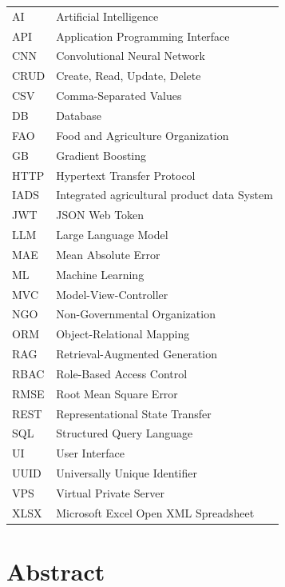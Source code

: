 \documentclass[12pt,a4paper,oneside]{report}
\begin{document}
\begin{tabular}{ll}
AI     & Artificial Intelligence \\
API    & Application Programming Interface \\
CNN    & Convolutional Neural Network \\
CRUD   & Create, Read, Update, Delete \\
CSV    & Comma-Separated Values \\
DB     & Database \\
FAO    & Food and Agriculture Organization \\
GB     & Gradient Boosting \\
HTTP   & Hypertext Transfer Protocol \\
IADS   & Integrated agricultural product data System \\
JWT    & JSON Web Token \\
LLM    & Large Language Model \\
MAE    & Mean Absolute Error \\
ML     & Machine Learning \\
MVC    & Model-View-Controller \\
NGO    & Non-Governmental Organization \\
ORM    & Object-Relational Mapping \\
RAG    & Retrieval-Augmented Generation \\
RBAC   & Role-Based Access Control \\
RMSE   & Root Mean Square Error \\
REST   & Representational State Transfer \\
SQL    & Structured Query Language \\
UI     & User Interface \\
UUID   & Universally Unique Identifier \\
VPS    & Virtual Private Server \\
XLSX   & Microsoft Excel Open XML Spreadsheet \\
\end{tabular}

\newpage

\chapter*{Abstract}
\end{document}
